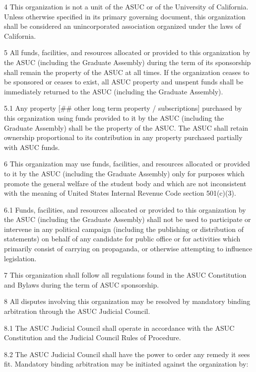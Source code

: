 \documentclass[11pt]{article}
\begin{document}
4 This organization is not a unit of the ASUC or of the University of California.
Unless otherwise specified in its primary governing document, this organization shall be considered an unincorporated association organized under the laws of California.

5 All funds, facilities, and resources allocated or provided to this organization by the ASUC (including the Graduate Assembly) during the term of its sponsorship shall remain the property of the ASUC at all times.
If the organization ceases to be sponsored or ceases to exist, all ASUC property and unspent funds shall be immediately returned to the ASUC (including the Graduate Assembly).

5.1 Any property [\#\# other long term property / subscriptions] purchased by this organization using funds provided to it by the ASUC (including the Graduate Assembly) shall be the property of the ASUC.
The ASUC shall retain ownership proportional to its contribution in any property purchased partially with ASUC funds.

6 This organization may use funds, facilities, and resources allocated or provided to it by the ASUC (including the Graduate Assembly) only for purposes which promote the general welfare of the student body and which are not inconsistent with the meaning of United States Internal Revenue Code section 501(c)(3).

6.1 Funds, facilities, and resources allocated or provided to this organization by the ASUC (including the Graduate Assembly) shall not be used to participate or intervene in any political campaign (including the publishing or distribution of statements) on behalf of any candidate for public office or for activities which primarily consist of carrying on propaganda, or otherwise attempting to influence legislation.

7 This organization shall follow all regulations found in the ASUC Constitution and Bylaws during the term of ASUC sponsorship.

8 All disputes involving this organization may be resolved by mandatory binding arbitration through the ASUC Judicial Council.

8.1 The ASUC Judicial Council shall operate in accordance with the ASUC Constitution and the Judicial Council Rules of Procedure.

8.2 The ASUC Judicial Council shall have the power to order any remedy it sees fit.
Mandatory binding arbitration may be initiated against the organization by:
\end{document}

